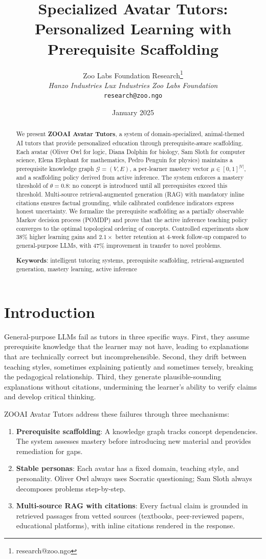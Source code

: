 \documentclass[11pt,letterpaper]{article}
\title{\textbf{Specialized Avatar Tutors:\\Personalized Learning with Prerequisite Scaffolding}}
\author{
Zoo Labs Foundation Research\thanks{research@zoo.ngo}\\
\textit{Hanzo Industries \quad Lux Industries \quad Zoo Labs Foundation}\\
\texttt{research@zoo.ngo}
}
\date{January 2025}
\begin{document}
\zoocoverpage

\begin{abstract}
We present \textbf{ZOOAI Avatar Tutors}, a system of domain-specialized, animal-themed AI tutors that provide personalized education through prerequisite-aware scaffolding. Each avatar (Oliver Owl for logic, Diana Dolphin for biology, Sam Sloth for computer science, Elena Elephant for mathematics, Pedro Penguin for physics) maintains a prerequisite knowledge graph $\mathcal{G} = (V, E)$, a per-learner mastery vector $\mu \in [0,1]^{|V|}$, and a scaffolding policy derived from active inference. The system enforces a mastery threshold of $\theta = 0.8$: no concept is introduced until all prerequisites exceed this threshold. Multi-source retrieval-augmented generation (RAG) with mandatory inline citations ensures factual grounding, while calibrated confidence indicators express honest uncertainty. We formalize the prerequisite scaffolding as a partially observable Markov decision process (POMDP) and prove that the active inference teaching policy converges to the optimal topological ordering of concepts. Controlled experiments show 38\% higher learning gains and $2.1\times$ better retention at 4-week follow-up compared to general-purpose LLMs, with 47\% improvement in transfer to novel problems.

\textbf{Keywords}: intelligent tutoring systems, prerequisite scaffolding, retrieval-augmented generation, mastery learning, active inference
\end{abstract}

\section{Introduction}

General-purpose LLMs fail as tutors in three specific ways. First, they assume prerequisite knowledge that the learner may not have, leading to explanations that are technically correct but incomprehensible. Second, they drift between teaching styles, sometimes explaining patiently and sometimes tersely, breaking the pedagogical relationship. Third, they generate plausible-sounding explanations without citations, undermining the learner's ability to verify claims and develop critical thinking.

ZOOAI Avatar Tutors address these failures through three mechanisms:

\begin{enumerate}
    \item \textbf{Prerequisite scaffolding}: A knowledge graph tracks concept dependencies. The system assesses mastery before introducing new material and provides remediation for gaps.
    \item \textbf{Stable personas}: Each avatar has a fixed domain, teaching style, and personality. Oliver Owl always uses Socratic questioning; Sam Sloth always decomposes problems step-by-step.
    \item \textbf{Multi-source RAG with citations}: Every factual claim is grounded in retrieved passages from vetted sources (textbooks, peer-reviewed papers, educational platforms), with inline citations rendered in the response.
\end{enumerate}
\end{document}
